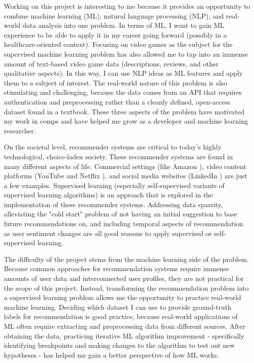 \documentclass[10pt,twocolumn]{article}
\begin{document}
Working on this project is interesting to me because it provides an opportunity to combine machine learning (ML), natural language processing (NLP), and real-world data analysis into one problem. In terms of ML, I want to gain ML experience to be able to apply it in my career going forward (possibly in a healthcare-oriented context). Focusing on video games as the subject for the supervised machine learning problem has also allowed me to tap into an immense amount of text-based video game data (descriptions, reviews, and other qualitative aspects). In this way, I can use NLP ideas as ML features and apply them to a subject of interest. The real-world nature of this problem is also stimulating and challenging, because the data comes from an API that requires authentication and preprocessing rather than a cleanly defined, open-access dataset found in a textbook. These three aspects of the problem have motivated my work in comps and have helped me grow as a developer and machine learning researcher.

On the societal level, recommender systems are critical to today's highly technological, choice-laden society. These recommender systems are found in many different aspects of life. Commercial settings (like Amazon \cite{AmazonRS}), video content platforms (YouTube \cite{YouTubeRS} and Netflix \cite{NetflixRS}), and social media websites (LinkedIn \cite{LinkedInRS}) are just a few examples. Supervised learning (especially self-supervised variants of supervised learning algorithms) is an approach that is explored in the implementation of these recommender systems. Addressing data sparsity, alleviating the "cold start" problem of not having an initial suggestion to base future recommendations on, and including temporal aspects of recommendation as user sentiment changes are all good reasons to apply supervised or self-supervised learning. \cite{JYu, XXin, Matuszyk}

The difficulty of the project stems from the machine learning side of the problem. Because common approaches for recommendation systems require immense amounts of user data and interconnected user profiles, they are not practical for the scope of this project. Instead, transforming the recommendation problem into a supervised learning problem allows me the opportunity to practice real-world machine learning. Deciding which dataset I can use to provide ground-truth labels for recommendation is good practice, because real-world applications of ML often require extracting and preprocessing data from different sources. After obtaining the data, practicing iterative ML algorithm improvement - specifically identifying breakpoints and making changes to the algorithm to test out new hypotheses - has helped me gain a better perspective of how ML works.
\end{document}
